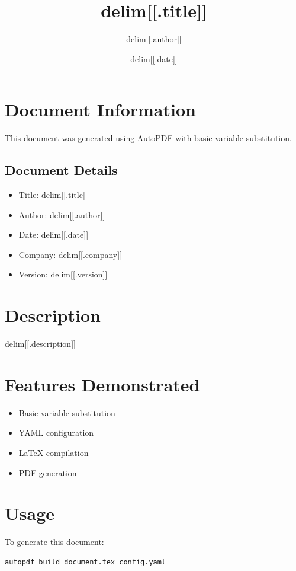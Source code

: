 \documentclass{article}
\title{delim[[.title]]}
\author{delim[[.author]]}
\date{delim[[.date]]}
\begin{document}
\maketitle

\section{Document Information}
This document was generated using AutoPDF with basic variable substitution.

\subsection{Document Details}
\begin{itemize}
\item Title: delim[[.title]]
\item Author: delim[[.author]]
\item Date: delim[[.date]]
\item Company: delim[[.company]]
\item Version: delim[[.version]]
\end{itemize}

\section{Description}
delim[[.description]]

\section{Features Demonstrated}
\begin{itemize}
\item Basic variable substitution
\item YAML configuration
\item LaTeX compilation
\item PDF generation
\end{itemize}

\section{Usage}
To generate this document:
\begin{verbatim}
autopdf build document.tex config.yaml
\end{verbatim}
\end{document}
